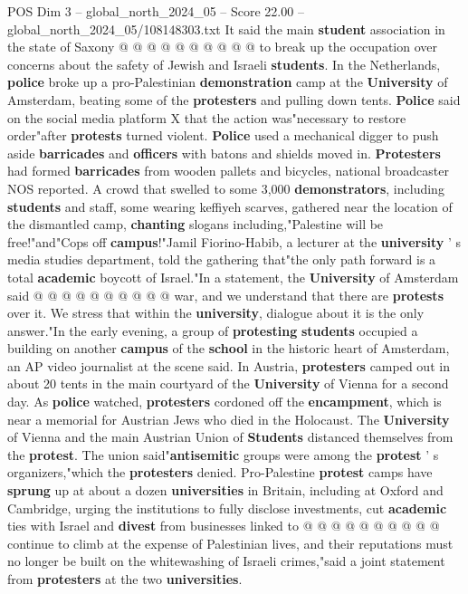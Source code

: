 \begin{textsample}{POS Dim 3 – global\_north\_2024\_05 – Score 22.00 – global\_north\_2024\_05/108148303.txt}
It said the main \textbf{student} association in the state of Saxony @ @ @ @ @ @ @ @ @ @ to break up the occupation over concerns about the safety of Jewish and Israeli \textbf{students}.
In the Netherlands, \textbf{police} broke up a pro-Palestinian \textbf{demonstration} camp at the \textbf{University} of Amsterdam, beating some of the \textbf{protesters} and pulling down tents. \textbf{Police} said on the social media platform X that the action was"necessary to restore order"after \textbf{protests} turned violent. \textbf{Police} used a mechanical digger to push aside \textbf{barricades} and \textbf{officers} with batons and shields moved in. \textbf{Protesters} had formed \textbf{barricades} from wooden pallets and bicycles, national broadcaster NOS reported.
A crowd that swelled to some 3,000 \textbf{demonstrators}, including \textbf{students} and staff, some wearing keffiyeh scarves, gathered near the location of the dismantled camp, \textbf{chanting} slogans including,"Palestine will be free!"and"Cops off \textbf{campus}!"Jamil Fiorino-Habib, a lecturer at the \textbf{university} ' s media studies department, told the gathering that"the only path forward is a total \textbf{academic} boycott of Israel."In a statement, the \textbf{University} of Amsterdam said @ @ @ @ @ @ @ @ @ @ war, and we understand that there are \textbf{protests} over it.
We stress that within the \textbf{university}, dialogue about it is the only answer."In the early evening, a group of \textbf{protesting} \textbf{students} occupied a building on another \textbf{campus} of the \textbf{school} in the historic heart of Amsterdam, an AP video journalist at the scene said.
In Austria, \textbf{protesters} camped out in about 20 tents in the main courtyard of the \textbf{University} of Vienna for a second day.
As \textbf{police} watched, \textbf{protesters} cordoned off the \textbf{encampment}, which is near a memorial for Austrian Jews who died in the Holocaust.
The \textbf{University} of Vienna and the main Austrian Union of \textbf{Students} distanced themselves from the \textbf{protest}.
The union said"\textbf{antisemitic} groups were among the \textbf{protest} ' s organizers,"which the \textbf{protesters} denied.
Pro-Palestine \textbf{protest} camps have \textbf{sprung} up at about a dozen \textbf{universities} in Britain, including at Oxford and Cambridge, urging the institutions to fully disclose investments, cut \textbf{academic} ties with Israel and \textbf{divest} from businesses linked to @ @ @ @ @ @ @ @ @ @ continue to climb at the expense of Palestinian lives, and their reputations must no longer be built on the whitewashing of Israeli crimes,"said a joint statement from \textbf{protesters} at the two \textbf{universities}.

\end{textsample}
